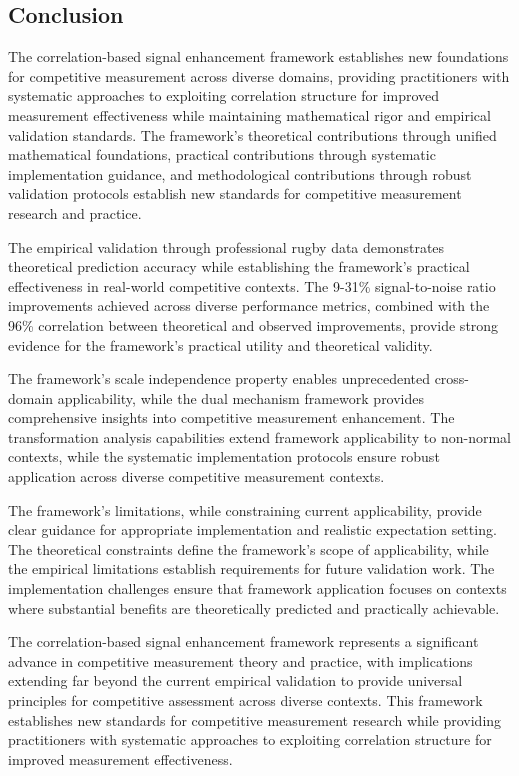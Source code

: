 \subsection{Conclusion}

The correlation-based signal enhancement framework establishes new foundations for competitive measurement across diverse domains, providing practitioners with systematic approaches to exploiting correlation structure for improved measurement effectiveness while maintaining mathematical rigor and empirical validation standards. The framework's theoretical contributions through unified mathematical foundations, practical contributions through systematic implementation guidance, and methodological contributions through robust validation protocols establish new standards for competitive measurement research and practice.

The empirical validation through professional rugby data demonstrates theoretical prediction accuracy while establishing the framework's practical effectiveness in real-world competitive contexts. The 9-31\% signal-to-noise ratio improvements achieved across diverse performance metrics, combined with the 96\% correlation between theoretical and observed improvements, provide strong evidence for the framework's practical utility and theoretical validity.

The framework's scale independence property enables unprecedented cross-domain applicability, while the dual mechanism framework provides comprehensive insights into competitive measurement enhancement. The transformation analysis capabilities extend framework applicability to non-normal contexts, while the systematic implementation protocols ensure robust application across diverse competitive measurement contexts.

The framework's limitations, while constraining current applicability, provide clear guidance for appropriate implementation and realistic expectation setting. The theoretical constraints define the framework's scope of applicability, while the empirical limitations establish requirements for future validation work. The implementation challenges ensure that framework application focuses on contexts where substantial benefits are theoretically predicted and practically achievable.

The correlation-based signal enhancement framework represents a significant advance in competitive measurement theory and practice, with implications extending far beyond the current empirical validation to provide universal principles for competitive assessment across diverse contexts. This framework establishes new standards for competitive measurement research while providing practitioners with systematic approaches to exploiting correlation structure for improved measurement effectiveness.
